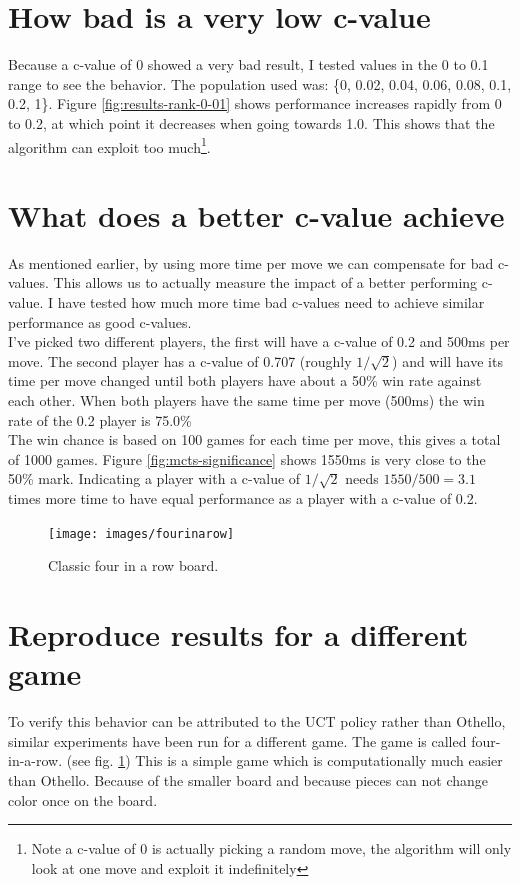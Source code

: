 \documentclass[
11pt, %
english, %
singlespacing, %
headsepline, %
]{MastersDoctoralThesis} %
\begin{document}
\section{How bad is a very low c-value}
Because a c-value of 0 showed a very bad result, I tested values in the 0 to 0.1 range to see the behavior. The population used was: \{0, 0.02, 0.04, 0.06, 0.08, 0.1, 0.2, 1\}. Figure \ref{fig:results-rank-0-01} shows performance increases rapidly from 0 to 0.2, at which point it decreases when going towards 1.0. This shows that the algorithm can exploit too much\footnote{Note a c-value of 0 is actually picking a random move, the algorithm will only look at one move and exploit it indefinitely}.

\begin{figure}[h]

\end{figure}
\section{What does a better c-value achieve}
\label{section:optimal-cvalue-achieve}
As mentioned earlier, by using more time per move we can compensate for bad c-values. This allows us to actually measure the impact of a better performing c-value. I have tested how much more time bad c-values need to achieve similar performance as good c-values.\\
I've picked two different players, the first will have a c-value of 0.2 and 500ms per move. The second player has a c-value of 0.707 (roughly $1/\sqrt{2}$) and will have its time per move changed until both players have about a 50\% win rate against each other. When both players have the same time per move (500ms) the win rate of the 0.2 player is 75.0\%\\
The win chance is based on 100 games for each time per move, this gives a total of 1000 games. Figure \ref{fig:mcts-significance} shows 1550ms is very close to the 50\% mark. Indicating a player with a c-value of $1/\sqrt{2}$ needs $1550/500 = 3.1$ times more time to have equal performance as a player with a c-value of 0.2.

\vfill
\pagebreak
\begin{figure}
	\centering
	\texttt{[image: images/fourinarow]}
	\caption{Classic four in a row board.}
	\label{fig:fourinarow-board}
\end{figure}
\section{Reproduce results for a different game}
To verify this behavior can be attributed to the UCT policy rather than Othello, similar experiments have been run for a different game. The game is called four-in-a-row. (see fig. \ref{fig:fourinarow-board}) This is a simple game which is computationally much easier than Othello. Because of the smaller board and because pieces can not change color once on the board.
\end{document}
